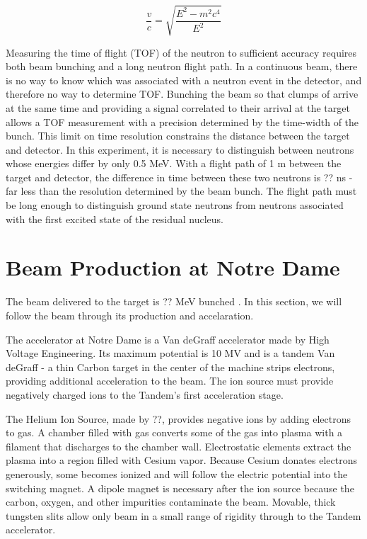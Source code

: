 \begin{equation}
\frac{v}{c} = \sqrt{\frac{E^2 - m^2c^4}{E^2}}
\label{eq:TOF}
\end{equation}

Measuring the time of flight (TOF) of the neutron to sufficient accuracy requires both beam bunching and a long neutron flight path.  In a continuous beam, there is no way to know which  was associated with a neutron event in the detector, and therefore no way to determine TOF.  Bunching the beam so that clumps of  arrive at the same time and providing a signal correlated to their arrival at the target allows a TOF measurement with a precision determined by the time-width of the bunch.  This limit on time resolution constrains the distance between the target and detector.  In this experiment, it is necessary to distinguish between neutrons whose energies differ by only 0.5 MeV.  With a flight path of 1 m between the target and detector, the difference in time between these two neutrons is ?? ns - far less than the resolution determined by the beam bunch.  The flight path must be long enough to distinguish ground state neutrons from neutrons associated with the first excited state of the residual nucleus.

\section{Beam Production at Notre Dame}
The beam delivered to the target is ?? MeV bunched .  In this section, we will follow the beam through its production and accelaration.

The accelerator at Notre Dame is a Van deGraff accelerator made by High Voltage Engineering.  Its maximum potential is 10 MV and is a tandem Van deGraff - a thin Carbon target in the center of the machine strips electrons, providing additional acceleration to the beam.  The ion source must provide negatively charged ions to the Tandem's first acceleration stage.

The Helium Ion Source, made by ??, provides negative  ions by adding electrons to  gas.  A chamber filled with  gas converts some of the gas into plasma with a filament that discharges to the chamber wall.  Electrostatic elements extract the plasma into a region filled with Cesium vapor.  Because Cesium donates electrons generously, some  becomes ionized and will follow the electric potential into the switching magnet.  A dipole magnet is necessary after the ion source because the carbon, oxygen, and other impurities contaminate the  beam.  Movable, thick tungsten slits allow only beam in a small range of rigidity through to the Tandem accelerator.

